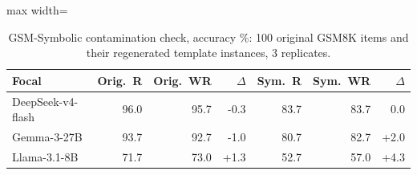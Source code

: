 \begin{table}[t]
\centering
\caption{GSM-Symbolic contamination check, accuracy \%: 100 original GSM8K items and their regenerated template instances, 3 replicates.}
\label{tab:x4}
\begin{adjustbox}{max width=\linewidth}
\small
\begin{tabular}{@{}lrrrrrr@{}}
\toprule
Focal & Orig.\ R & Orig.\ WR & $\Delta$ & Sym.\ R & Sym.\ WR & $\Delta$ \\
\midrule
DeepSeek-v4-flash & 96.0 & 95.7 & -0.3 & 83.7 & 83.7 & 0.0 \\
Gemma-3-27B & 93.7 & 92.7 & -1.0 & 80.7 & 82.7 & +2.0 \\
Llama-3.1-8B & 71.7 & 73.0 & +1.3 & 52.7 & 57.0 & +4.3 \\
\bottomrule
\end{tabular}
\end{adjustbox}
\end{table}
